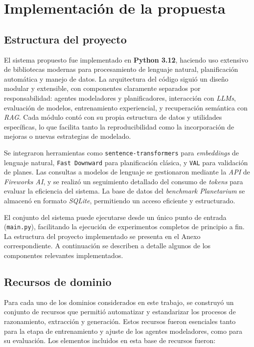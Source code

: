 \chapter{Implementación de la propuesta}\label{chapter:implementation}

\section{Estructura del proyecto}

El sistema propuesto fue implementado en \textbf{Python 3.12}, haciendo uso extensivo de bibliotecas modernas para procesamiento de lenguaje natural, planificación automática y manejo de datos. La arquitectura del código siguió un diseño modular y extensible, con componentes claramente separados por responsabilidad: agentes modeladores y planificadores, interacción con \textit{LLMs}, evaluación de modelos, entrenamiento experiencial, y recuperación semántica con \textit{RAG}. Cada módulo contó con su propia estructura de datos y utilidades específicas, lo que facilita tanto la reproducibilidad como la incorporación de mejoras o nuevas estrategias de modelado. 

Se integraron herramientas como \texttt{sentence-transformers} para \textit{embeddings} de lenguaje natural, \texttt{Fast Downward} para planificación clásica, y \texttt{VAL} para validación de planes. Las consultas a modelos de lenguaje se gestionaron mediante la \textit{API} de \textit{Fireworks AI}, y se realizó un seguimiento detallado del consumo de \textit{tokens} para evaluar la eficiencia del sistema. La base de datos del \textit{benchmark Planetarium} se almacenó en formato \textit{SQLite}, permitiendo un acceso eficiente y estructurado. 

El conjunto del sistema puede ejecutarse desde un único punto de entrada (\texttt{main.py}), facilitando la ejecución de experimentos completos de principio a fin. La estructura del proyecto implementado se presenta en el Anexo correspondiente. A continuación se describen a detalle algunos de los componentes relevantes implementados.

\section{Recursos de dominio}

Para cada uno de los dominios considerados en este trabajo, se construyó un conjunto de recursos que permitió automatizar y estandarizar los procesos de razonamiento, extracción y generación. Estos recursos fueron esenciales tanto para la etapa de entrenamiento y ajuste de los agentes modeladores, como para su evaluación. Los elementos incluidos en esta base de recursos fueron:

